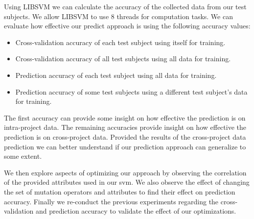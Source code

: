 Using LIBSVM we can calculate the accuracy of the collected data from our test subjects. We allow LIBSVM to use 8 threads for computation tasks. We can evaluate how effective our predict approach is using the following accuracy values:

\begin{itemize}
  \item Cross-validation accuracy of each test subject using itself for training.
  \item Cross-validation accuracy of all test subjects using all data for training.
  \item Prediction accuracy of each test subject using all data for training.
  \item Prediction accuracy of some test subjects using a different test subject's data for training.
\end{itemize}

The first accuracy can provide some insight on how effective the prediction is on intra-project data. The remaining accuracies provide insight on how effective the prediction is on cross-project data. Provided the results of the cross-project data prediction we can better understand if our prediction approach can generalize to some extent.

We then explore aspects of optimizing our approach by observing the correlation of the provided attributes used in our \gls{svm}. We also observe the effect of changing the set of mutation operators and attributes to find their effect on prediction accuracy. Finally we re-conduct the previous experiments regarding the cross-validation and prediction accuracy to validate the effect of our optimizations.


